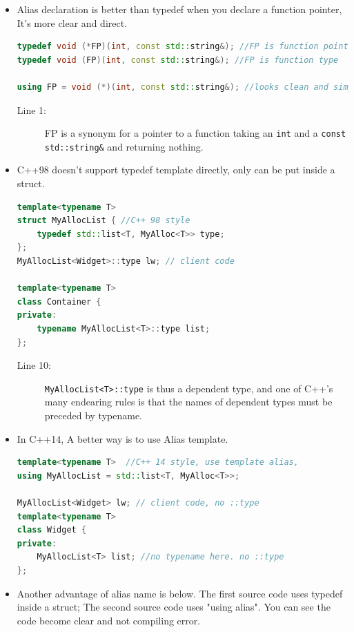 \documentclass[a4paper,11pt,twoside]{book}
\begin{document}
\begin{itemize}
    \item Alias declaration is better than typedef when you declare a function pointer, It's more clear and direct.
\begin{lstlisting}[frame=single, language=c++]
typedef void (*FP)(int, const std::string&); //FP is function pointer type
typedef void (FP)(int, const std::string&); //FP is function type

using FP = void (*)(int, const std::string&); //looks clean and simple.
\end{lstlisting}

\begin{description}
	\item[Line 1:] FP is a synonym for a pointer to a function taking an \texttt{int} and a \texttt{const std::string\&} and returning nothing.
\end{description}

    \item C++98 doesn't support typedef template directly, only can be put inside a struct. 
\begin{lstlisting}[frame=single, language=c++]
template<typename T>
struct MyAllocList { //C++ 98 style
	typedef std::list<T, MyAlloc<T>> type;
};
MyAllocList<Widget>::type lw; // client code

template<typename T>
class Container { 
private:
	typename MyAllocList<T>::type list; 
};
\end{lstlisting}
\begin{description}
	\item[Line 10:] \texttt{MyAllocList<T>::type} is thus a dependent type, and one of C++'s many endearing rules is that the names of dependent types must be preceded by typename.
\end{description}


\item In C++14, A better way is to use Alias template.

\begin{lstlisting}[frame=single, language=c++]
template<typename T>  //C++ 14 style, use template alias,
using MyAllocList = std::list<T, MyAlloc<T>>;

MyAllocList<Widget> lw; // client code, no ::type
template<typename T>
class Widget {
private:
	MyAllocList<T> list; //no typename here. no ::type
};
\end{lstlisting}



	\item Another advantage of alias name is below. The first source code uses typedef inside a struct; The second source code uses "using alias". You can see the code become clear and not compiling error.


\end{itemize}
\end{document}

